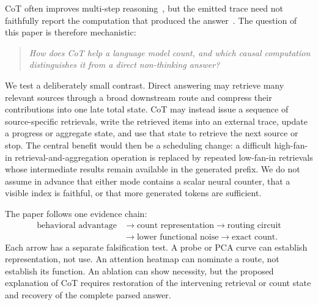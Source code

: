 \documentclass[11pt]{article}
\begin{document}
CoT often improves multi-step reasoning~\citep{wei2022cot}, but the emitted trace need not faithfully report the computation that produced the answer~\citep{turpin2023unfaithful}. The question of this paper is therefore mechanistic:

\begin{quote}
\emph{How does CoT help a language model count, and which causal computation distinguishes it from a direct non-thinking answer?}
\end{quote}

We test a deliberately small contrast. Direct answering may retrieve many relevant sources through a broad downstream route and compress their contributions into one late total state. CoT may instead issue a sequence of source-specific retrievals, write the retrieved items into an external trace, update a progress or aggregate state, and use that state to retrieve the next source or stop. The central benefit would then be a scheduling change: a difficult high-fan-in retrieval-and-aggregation operation is replaced by repeated low-fan-in retrievals whose intermediate results remain available in the generated prefix. We do not assume in advance that either mode contains a scalar neural counter, that a visible index is faithful, or that more generated tokens are sufficient.

The paper follows one evidence chain:
\begin{equation}
\begin{aligned}
\text{behavioral advantage}
&\longrightarrow
\text{count representation}
\longrightarrow
\text{routing circuit}\\[-0.15em]
&\longrightarrow
\text{lower functional noise}
\longrightarrow
\text{exact count}.
\end{aligned}
\label{eq:evidence-chain}
\end{equation}
Each arrow has a separate falsification test. A probe or PCA curve can establish representation, not use. An attention heatmap can nominate a route, not establish its function. An ablation can show necessity, but the proposed explanation of CoT requires restoration of the intervening retrieval or count state and recovery of the complete parsed answer.
\end{document}
